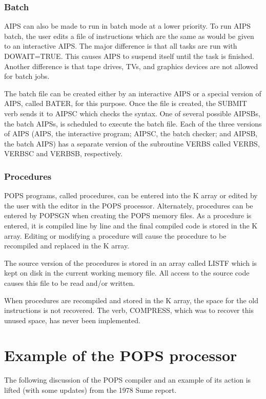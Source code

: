 \subsubsection{Batch}
AIPS can also be made to run in batch mode at a lower priority.  To
run AIPS batch, the user edits a file of instructions which are the
same as would be given to an interactive AIPS.  The major difference
is that all tasks are run with DOWAIT=TRUE.  This causes AIPS to
suspend itself until the task is finished.  Another difference is that
tape drives, TVs, and graphics devices are not allowed for batch jobs.

The batch file can be created either by an interactive AIPS or a
special version of AIPS, called BATER, for this purpose.  Once the
file is created, the SUBMIT verb sends it to AIPSC which checks the
syntax. One of several possible AIPSBs, the batch AIPSs, is scheduled
to execute the batch file.  Each of the three versions of AIPS (AIPS,
the interactive program; AIPSC, the batch checker; and AIPSB, the
batch AIPS) has a separate version of the subroutine VERBS called
VERBS, VERBSC and VERBSB, respectively.

\subsubsection{Procedures}
POPS programs, called procedures, can be entered into the K array or
edited by the user with the editor in the POPS processor. Alternately,
procedures can be entered by POPSGN when creating the POPS memory
files.  As a procedure is entered, it is compiled line by line and the
final compiled code is stored in the K array. Editing or modifying a
procedure will cause the procedure to be recompiled and replaced in
the K array.

The source version of the procedures is stored in an array called
LISTF which is kept on disk in the current working memory file.  All
access to the source code causes this file to be read and/or written.

When procedures are recompiled and stored in the K array, the space
for the old instructions is not recovered.  The verb, COMPRESS, which
was to recover this unused space, has never been implemented.


\section{Example of the POPS processor}
The following discussion of the POPS compiler and an example of its
action is lifted (with some updates) from the 1978 Sume report.


